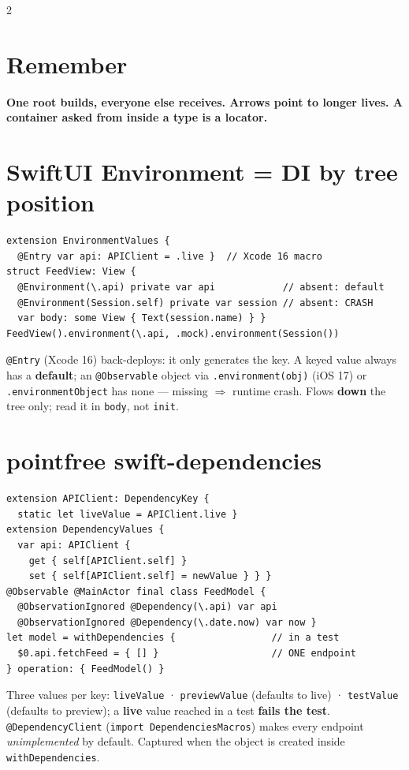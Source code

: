 \documentclass[8pt]{extarticle}
\begin{document}
\begin{multicols}{2}
\section{Remember}
\textbf{One root builds, everyone else receives. Arrows point to longer lives. A container asked
from inside a type is a locator.}


\columnbreak

\section{SwiftUI Environment = DI by tree position}
\begin{lstlisting}[language=SwiftSheet]
extension EnvironmentValues {
  @Entry var api: APIClient = .live }  // Xcode 16 macro
struct FeedView: View {
  @Environment(\.api) private var api            // absent: default
  @Environment(Session.self) private var session // absent: CRASH
  var body: some View { Text(session.name) } }
FeedView().environment(\.api, .mock).environment(Session())
\end{lstlisting}
{\footnotesize \texttt{@Entry} (Xcode 16) back-deploys: it only generates the key. A keyed value
always has a \textbf{default}; an \texttt{@Observable} object via \texttt{.environment(obj)} (iOS 17)
or \texttt{.environmentObject} has none — missing $\Rightarrow$ runtime crash. Flows \textbf{down}
the tree only; read it in \texttt{body}, not \texttt{init}.\par}

\section{pointfree swift-dependencies}
\begin{lstlisting}[language=SwiftSheet]
extension APIClient: DependencyKey {
  static let liveValue = APIClient.live }
extension DependencyValues {
  var api: APIClient {
    get { self[APIClient.self] }
    set { self[APIClient.self] = newValue } } }
@Observable @MainActor final class FeedModel {
  @ObservationIgnored @Dependency(\.api) var api
  @ObservationIgnored @Dependency(\.date.now) var now }
let model = withDependencies {                 // in a test
  $0.api.fetchFeed = { [] }                    // ONE endpoint
} operation: { FeedModel() }
\end{lstlisting}
{\footnotesize Three values per key: \texttt{liveValue} · \texttt{previewValue} (defaults to live)
· \texttt{testValue} (defaults to preview); a \textbf{live} value reached in a test
\textbf{fails the test}. \texttt{@DependencyClient} (\texttt{import DependenciesMacros}) makes every
endpoint \emph{unimplemented} by default. Captured when the object is created inside
\texttt{withDependencies}.\par}


\end{multicols}
\end{document}
